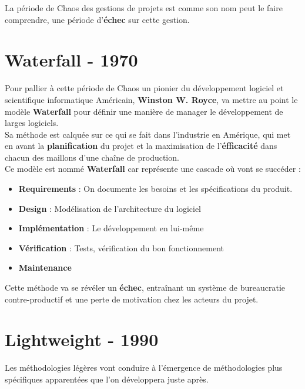 \documentclass{report}
\begin{document}
		La période de Chaos des gestions de projets est comme son nom peut le faire comprendre, une période d'\textbf{échec} sur cette gestion.

	\section{Waterfall - 1970}

		Pour pallier à cette période de Chaos un pionier du développement logiciel et scientifique informatique Américain, \textbf{Winston W. Royce}, va mettre au point le modèle \textbf{Waterfall} pour définir une manière de manager le développement de larges logiciels.\\

		Sa méthode est calquée sur ce qui se fait dans l'industrie en Amérique, qui met en avant la \textbf{planification} du projet et la maximisation de l'\textbf{éfficacité} dans chacun des maillons d'une chaîne de production.\\

		Ce modèle est nommé \textbf{Waterfall} car représente une cascade où vont se succéder : \\

		\begin{itemize}
			\item \textbf{Requirements} : On documente les besoins et les spécifications du produit.
			\item \textbf{Design} : Modélisation de l'architecture du logiciel
			\item \textbf{Implémentation} : Le développement en lui-même
			\item \textbf{Vérification} : Tests, vérification du bon fonctionnement
			\item \textbf{Maintenance}\\
		\end{itemize}

		Cette méthode va se révéler un \textbf{échec}, entraînant un système de bureaucratie contre-productif et une perte de motivation chez les acteurs du projet.\\

	\section{Lightweight - 1990}

		Les méthodologies légères vont conduire à l'émergence de méthodologies plus spécifiques apparentées que l'on développera juste après.\\
\end{document}
